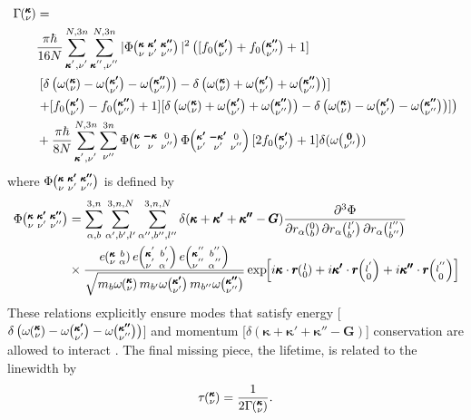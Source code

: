 \begin{equation}\label{EQ:Gamma_anh}
\begin{split}
\Gamma \kv &= \\
&\frac{\pi\hbar}{16N}\SUM[']\SUM['']|\Phi\kvkvpkvpp|^2 \left([f_0\kvp+f_0\kvpp+1]\right.\\
&\left.[\delta\left(\omega\kv-\omega\kvp-\omega\kvpp\right)-\delta\left(\omega\kv+\omega\kvp+\omega\kvpp\right)]\right.\\
&\left.+[f_0\kvp-f_0\kvpp+1][\delta\left(\omega\kv+\omega\kvp+\omega\kvpp\right)-\delta\left(\omega\kv-\omega\kvp-\omega\kvpp\right)] \right)\\
&+\frac{\pi\hbar}{8N}\SUM[']\sum_{\nu''}^{3n}\Phi\kvOv\Phi\kvpOv[2f_0\kvp+1]\delta(\omega\Ovpp)
\end{split}
\end{equation}
%
where $\Phi\mspace{-4.0mu}\left(\mspace{-8.0mu} \begin{smallmatrix}&\pmb{\kappa}&\pmb{\kappa'}&\pmb{\kappa''} \\&\nu&\nu'&\nu''\end{smallmatrix} \mspace{-3.0mu}\right)$ is defined by
%
\begin{equation}\label{EQ:Phi_anh}
\begin{split}
\Phi\kvkvpkvpp&=\sum_{\alpha,b}^{3,n}\sum_{\alpha',b',l'}^{3,n,N}\sum_{\alpha'',b'',l''}^{3,n,N}\delta(\pmb{\kappa}+\pmb{\kappa'}+\pmb{\kappa''}-\pmb{G})\frac{\partial^3\Phi}{\partial r_\alpha \Ob \partial r_\alpha \lbp \partial r_\alpha \lbpp}\\
&\times \frac{e \kvba e \kvbain{'}e \kvbain{''}}{\sqrt{m_{b}\omega\kv
m_{b'}\omega\kvp m_{b''}\omega\kvpp}}\EXP{i\pmb{\kappa}\cdot \pmb{r}\lO+i\pmb{\kappa'}\cdot \pmb{r}\lOin{'}+i\pmb{\kappa''}\cdot \pmb{r}\lOin{''}}
\end{split}
\end{equation}
%
These relations explicitly ensure modes that satisfy energy [$\delta\left(\omega\kv-\omega\kvp-\omega\kvpp\right)$] and momentum [$\delta(\pmb{\kappa}+\pmb{\kappa'}+\pmb{\kappa''}-\pmb{G})$] conservation are allowed to interact \cite{srivastava1990physics}. The final missing piece, the lifetime, is related to the linewidth by
%
\begin{equation}\label{EQ:lifetime}
\tau \mspace{-4.0mu}\left(\mspace{-8.0mu} \begin{smallmatrix}&\pmb{\kappa} \\&\nu\end{smallmatrix} \mspace{-3.0mu}\right)=\frac{1}{2\Gamma\mspace{-4.0mu}\left(\mspace{-8.0mu} \begin{smallmatrix}&\pmb{\kappa} \\&\nu\end{smallmatrix} \mspace{-3.0mu}\right)}.
\end{equation}
%

